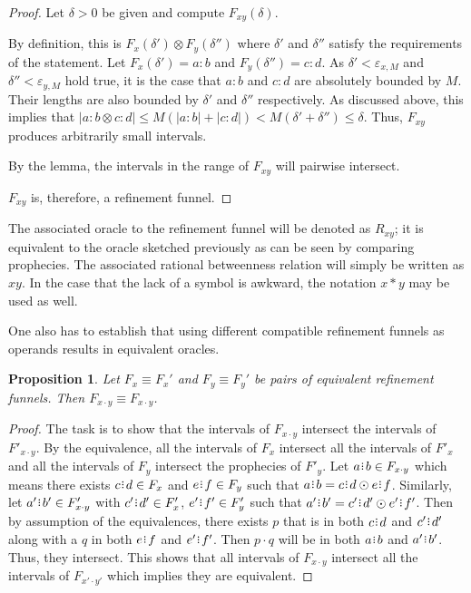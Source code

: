 \documentclass[12pt]{article}
\newtheorem{proposition}{Proposition}[section]
\begin{document}
\begin{proof}

    Let $\delta > 0$ be given and compute $F_{xy}(\delta)$.

    By definition, this is $F_x(\delta') \otimes F_y(\delta'')$ where $\delta'$ and $\delta''$ satisfy the requirements of the statement. Let $F_x(\delta') = a:b$ and $F_y(\delta'') = c:d$. As $\delta' < \varepsilon_{x, M}$ and $\delta'' < \varepsilon_{y,M}$ hold true, it is the case that $a:b$ and $c:d$ are absolutely bounded by $M$. Their lengths are also bounded by $\delta'$ and $\delta''$ respectively. As discussed above, this implies that $|a:b \otimes c:d| \leq M(|a:b| + |c:d|) < M(\delta' + \delta'') \leq \delta$. Thus, $F_{xy}$ produces arbitrarily small intervals. 
         
    By the lemma, the intervals in the range of $F_{xy}$ will pairwise intersect. 
    
    $F_{xy}$ is, therefore, a refinement funnel. 

    
\end{proof}

The associated oracle to the refinement funnel will be denoted as $R_{xy}$; it is equivalent to the oracle sketched previously as can be seen by comparing prophecies. The associated rational betweenness relation will simply be written as $xy$. In the case that the lack of a symbol is awkward, the notation $x * y$ may be used as well. 

One also has to establish that using different compatible refinement funnels as operands results in equivalent oracles.

\begin{proposition}
    Let $F_x \equiv F_x'$ and $F_y \equiv F_y'$ be pairs of equivalent refinement funnels. Then $F_{x \cdot y} \equiv F_{x \cdot y}$. 
\end{proposition}

\begin{proof}
The task is to show that the intervals of $F_{x \cdot y}$ intersect the intervals of $F'_{x \cdot y}$. By the equivalence, all the intervals of $F_x$ intersect all the intervals of $F'_x$ and all the intervals of $F_y$ intersect the prophecies of $F'_y$. Let $a\rint b \in F_{x \cdot y}$ which means there exists $c\rint d \in F_x$ and $e\rint f \in F_y$ such that $a\rint b = c\rint d \odot e\rint f$. Similarly, let $a'\rint b'\in F'_{x \cdot y}$ with $c'\rint d' \in F'_x$, $e'\rint f' \in F'_y$ such that $a'\rint b' = c'\rint d' \odot e'\rint f'$. Then by assumption of the equivalences, there exists $p$ that is in both $c\rint d$ and $c'\rint d'$ along with a $q$ in both $e\rint f$ and $e'\rint f'$. Then $p \cdot q$ will be in both $a\rint b$ and $a'\rint b'$. Thus, they intersect. This shows that all intervals of $F_{x \cdot y}$ intersect all the intervals of $F_{x' \cdot y'}$ which implies they are equivalent. 
\end{proof}
\end{document}
